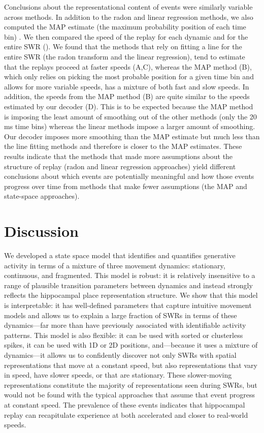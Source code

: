 \documentclass[9pt,lineno]{elife}
\begin{document}
Conclusions about the representational content of events were similarly variable across methods. In addition to the radon and linear regression methods, we also computed  the MAP estimate (the maximum probability position of each time bin) \citep{PfeifferAutoassociativedynamicsgeneration2015, StellaHippocampalReactivationRandom2019, KaeferReplayBehavioralSequences2020}. We then compared the speed of the replay for each dynamic and for the entire SWR (). We found that the methods that rely on fitting a line for the entire SWR (the radon transform and the linear regression), tend to estimate that the replays proceed at faster speeds (A,C), whereas the MAP method (B), which only relies on picking the most probable position for a given time bin and allows for more variable speeds, has a mixture of both fast and slow speeds. In addition, the speeds from the MAP method (B) are quite similar to the speeds estimated by our decoder (D). This is to be expected because the MAP method is imposing the least amount of smoothing out of the other methods (only the 20 ms time bins) whereas the linear methods impose a larger amount of smoothing. Our decoder imposes more smoothing than the MAP estimate but much less than the line fitting methods and therefore is closer to the MAP estimates. These results indicate that the methods that made more assumptions about the structure of replay (radon and linear regression approaches) yield different conclusions about which events are potentially meaningful and how those events progress over time from methods that make fewer assumptions (the MAP and state-space approaches).

\section*{Discussion}
We developed a state space model that identifies and quantifies generative activity in terms of a mixture of three movement dynamics: stationary, continuous, and fragmented. This model is robust: it is relatively insensitive to a range of plausible transition parameters between dynamics and instead strongly reflects the hippocampal place representation structure. We show that this model is interpretable: it has well-defined parameters that capture intuitive movement models and allows us to explain a large fraction of SWRs in terms of these dynamics---far more than have previously associated with identifiable activity patterns. This model is also flexible: it can be used with sorted or clusterless spikes, it can be used with 1D or 2D positions, and---because it uses a mixture of dynamics---it allows us to confidently discover not only SWRs with spatial representations that move at a constant speed, but also representations that vary in speed, have slower speeds, or that are stationary. These slower-moving representations constitute the majority of representations seen during SWRs, but would not be found with the typical approaches that assume that event progress at constant speed. The prevalence of these events indicates that hippocampal replay can recapitulate experience at both accelerated and closer to real-world speeds.
\end{document}
